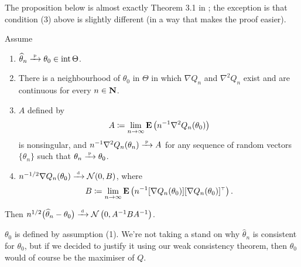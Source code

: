 \documentclass[11pt,letterpaper,reqno,oneside]{article}
\begin{document}
The proposition below is almost exactly Theorem 3.1 in \textcite{NeweyMcfadden1994}; the exception is that condition (3) above is slightly different (in a way that makes the proof easier).
%
\begin{proposition}
	\label{proposition:asymptotic_normality}
	Assume
	\begin{enumerate}



		\item $\widehat{\theta}_n \xrightarrow{{\scriptscriptstyle \mathrm{\;p\;}}} \theta_0 \in \operatorname*{int} \Theta$.

		\item There is a neighbourhood of $\theta_0$ in $\Theta$ in which $\nabla Q_n$ and $\nabla^2 Q_n$ exist and are continuous for every $n \in \mathbf{N}$.

		\item $A$ defined by
		\begin{equation*}
			A \coloneqq \lim_{n\to\infty}
			\mathbf{E}\left( n^{-1} \nabla^2 Q_n(\theta_0) \right) 
		\end{equation*}
		is nonsingular, and $n^{-1} \nabla^2 Q_n(\theta_n) \xrightarrow{{\scriptscriptstyle \mathrm{\;p\;}}} A$ for any sequence of random vectors $\{ \theta_n \}$ such that $\theta_n \xrightarrow{{\scriptscriptstyle \mathrm{\;p\;}}} \theta_0$.

		\item $n^{-1/2} \nabla Q_n(\theta_0) \xrightarrow{{\scriptscriptstyle \mathrm{\;d\;}}} \mathcal{N}(0,B)$, where
		\begin{equation*}
			B \coloneqq \lim_{n\to\infty}
			\mathbf{E}\left( n^{-1} [\nabla Q_n(\theta_0)] 
			[\nabla Q_n(\theta_0)]^{\scriptscriptstyle \top} \right) .
		\end{equation*}

	\end{enumerate}
	Then $n^{1/2} \bigl( \widehat{\theta}_n - \theta_0 \bigr) \xrightarrow{{\scriptscriptstyle \mathrm{\;d\;}}} \mathcal{N}\left( 0, A^{-1} B A^{-1} \right)$. 
\end{proposition}


\begin{remark}
	$\theta_0$ is defined by assumption (1). We're not taking a stand on why $\widehat{\theta}_n$ is consistent for $\theta_0$, but if we decided to justify it using our weak consistency theorem, then $\theta_0$ would of course be the maximiser of $Q$.
\end{remark}
\end{document}
